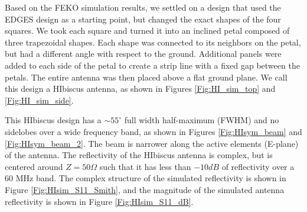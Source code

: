 Based on the FEKO simulation results, we settled on a design that used the EDGES design as a starting point, but changed the exact shapes of the four squares. We took each square and turned it into an inclined petal composed of three trapezoidal shapes. Each shape was connected to its neighbors on the petal, but had a different angle with respect to the ground. Additional panels were added to each side of the petal to create a strip line with a fixed gap between the petals. The entire antenna was then placed above a flat ground plane. We call this design a HIbiscus antenna, as shown in Figures \ref{Fig:HI_sim_top} and \ref{Fig:HI_sim_side}. 

This HIbiscus design has a $\sim 55^\circ$ full width half-maximum (FWHM) and no sidelobes over a wide frequency band, as shown in Figures \ref{Fig:HIsym_beam} and \ref{Fig:HIsym_beam_2}. The beam is narrower along the active elements (E-plane) of the antenna. The reflectivity of the HIbiscus antenna is complex, but is centered around $Z= 50 \Omega$ such that it has less than $-10 dB$ of reflectivity over a 60 MHz band. The complex structure of the simulated reflectivity is shown in Figure \ref{Fig:HIsim_S11_Smith}, and the magnitude of the simulated antenna reflectivity is shown in Figure \ref{Fig:HIsim_S11_dB}. 

